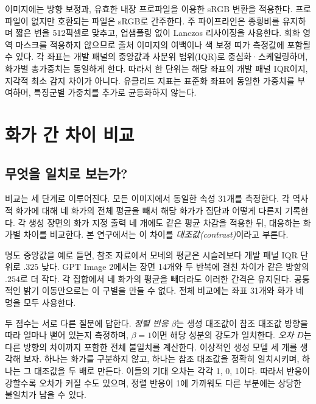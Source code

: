 \documentclass[11pt,a4paper]{article}
\begin{document}
이미지에는 방향 보정과, 유효한 내장 프로파일을 이용한 sRGB 변환을 적용한다. 프로파일이 없지만 호환되는 파일은 sRGB로 간주한다. 주 파이프라인은 종횡비를 유지하며 짧은 변을 512픽셀로 맞추고, 업샘플링 없이 Lanczos 리사이징을 사용한다. 회화 영역 마스크를 적용하지 않으므로 출처 이미지의 여백이나 색 보정 띠가 측정값에 포함될 수 있다. 각 좌표는 개발 패널의 중앙값과 사분위 범위(IQR)로 중심화·스케일링하며, 화가별 총가중치는 동일하게 한다. 따라서 한 단위는 해당 좌표의 개발 패널 IQR이지, 지각적 최소 감지 차이가 아니다. 유클리드 지표는 표준화 좌표에 동일한 가중치를 부여하며, 특징군별 가중치를 추가로 균등화하지 않는다.

\FloatBarrier
\section{화가 간 차이 비교}\label{sec:method}
\subsection{무엇을 일치로 보는가?}\label{sec:contrast-intuition}
비교는 세 단계로 이루어진다. 모든 이미지에서 동일한 속성 31개를 측정한다. 각 역사적 화가에 대해 네 화가의 전체 평균을 빼서 해당 화가가 집단과 어떻게 다른지 기록한다. 각 생성 장면의 화가 지정 출력 네 개에도 같은 평균 차감을 적용한 뒤, 대응하는 화가별 차이를 비교한다. 본 연구에서는 이 차이를 \emph{대조값(contrast)}이라고 부른다.

명도 중앙값을 예로 들면, 참조 자료에서 모네의 평균은 시슬레보다 개발 패널 IQR 단위로 $.325$ 낮다. GPT Image 2에서는 장면 14개와 두 반복에 걸친 차이가 같은 방향의 $.254$로 더 작다. 각 집합에서 네 화가의 평균을 빼더라도 이러한 간격은 유지된다. 공통적인 밝기 이동만으로는 이 구별을 만들 수 없다. 전체 비교에는 좌표 31개와 화가 네 명을 모두 사용한다.

두 점수는 서로 다른 질문에 답한다. \emph{정렬 반응} $\beta$는 생성 대조값이 참조 대조값 방향을 따라 얼마나 뻗어 있는지 측정하며, $\beta=1$이면 해당 성분의 강도가 일치한다. \emph{오차} $D$는 다른 방향의 차이까지 포함한 전체 불일치를 계산한다. 이상적인 생성 모델 세 개를 생각해 보자. 하나는 화가를 구분하지 않고, 하나는 참조 대조값을 정확히 일치시키며, 하나는 그 대조값을 두 배로 만든다. 이들의 기대 오차는 각각 1, 0, 1이다. 따라서 반응이 강할수록 오차가 커질 수도 있으며, 정렬 반응이 1에 가까워도 다른 부분에는 상당한 불일치가 남을 수 있다.
\end{document}
